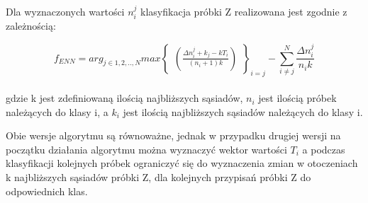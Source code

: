 Dla wyznaczonych wartości $n_i^j$ klasyfikacja próbki Z realizowana jest zgodnie z zależnością:

\begin{equation}
f_{ENN} = arg_{j \in 1,2,..,N} max \begin{Bmatrix}
(\frac{\Delta n_i^j + k_j -kT_i}{(n_i+1)k})
\end{Bmatrix}_{i=j} - \sum_{i \neq j}^N \frac{\Delta n_i^j}{n_i k}
\end{equation}\\
gdzie k jest zdefiniowaną ilością najbliższych sąsiadów, $n_i$ jest ilością próbek należących do klasy i, a $k_i$ jest ilością najbliższych sąsiadów należących do klasy i.

Obie wersje algorytmu są równoważne, jednak w przypadku drugiej wersji na początku działania algorytmu można wyznaczyć wektor wartości $T_i$ a podczas klasyfikacji kolejnych próbek ograniczyć się do wyznaczenia zmian w otoczeniach k najbliższych sąsiadów próbki Z, dla kolejnych przypisań próbki Z do odpowiednich klas.
